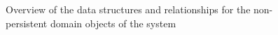 \documentclass[12pt]{article}
\begin{document}
\begin{figure}[H]
\centering	
{}
\caption{Overview of the data structures and relationships for the non-persistent domain objects of the
system}
\end{figure}
\end{document}

